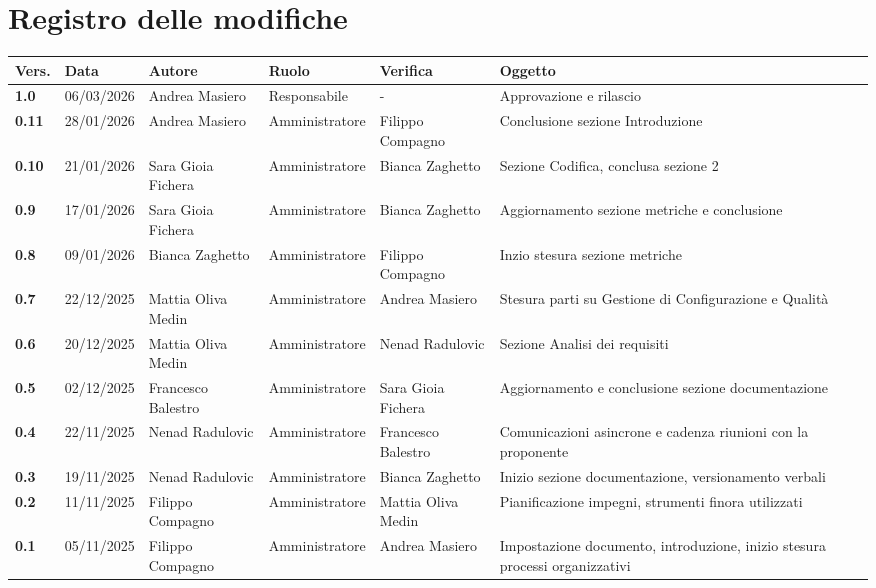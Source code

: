 \documentclass[a4paper,12pt]{article}
\begin{document}


\section*{Registro delle modifiche}
    \begin{xltabular}{\textwidth}{|l|l|X|l|X|X|}
        \hline
        \textbf{Vers.} & \textbf{Data} & \textbf{Autore} & \textbf{Ruolo} & \textbf{Verifica} & \textbf{Oggetto} \\
        \hline
        \endhead

        \endfoot

        \hline
        \endlastfoot

        \textbf{1.0} & 06/03/2026 & Andrea Masiero & Responsabile & - & Approvazione e rilascio \\
        \hline
        \textbf{0.11} & 28/01/2026 & Andrea Masiero & Amministratore & Filippo Compagno & Conclusione sezione Introduzione \\
        \hline
        \textbf{0.10} & 21/01/2026 & Sara Gioia Fichera & Amministratore & Bianca Zaghetto & Sezione Codifica, conclusa sezione 2 \\
        \hline
        \textbf{0.9} & 17/01/2026 & Sara Gioia Fichera & Amministratore & Bianca Zaghetto & Aggiornamento sezione metriche e conclusione \\
        \hline
        \textbf{0.8} & 09/01/2026 & Bianca Zaghetto & Amministratore & Filippo Compagno & Inzio stesura sezione metriche \\
        \hline
        \textbf{0.7} & 22/12/2025 & Mattia Oliva Medin & Amministratore & Andrea Masiero & Stesura parti su Gestione di Configurazione e Qualità \\
        \hline
        \textbf{0.6} & 20/12/2025 & Mattia Oliva Medin & Amministratore & Nenad Radulovic & Sezione Analisi dei requisiti \\
        \hline
        \textbf{0.5} & 02/12/2025 & Francesco Balestro & Amministratore & Sara Gioia Fichera & Aggiornamento e conclusione sezione documentazione \\
        \hline
        \textbf{0.4} & 22/11/2025 & Nenad Radulovic & Amministratore & Francesco Balestro & Comunicazioni asincrone e cadenza riunioni con la proponente \\
        \hline
        \textbf{0.3} & 19/11/2025 & Nenad Radulovic & Amministratore & Bianca Zaghetto & Inizio sezione documentazione, versionamento verbali \\
        \hline
        \textbf{0.2} & 11/11/2025 & Filippo Compagno & Amministratore & Mattia Oliva Medin & Pianificazione impegni, strumenti finora utilizzati \\
        \hline
        \textbf{0.1} & 05/11/2025 & Filippo Compagno & Amministratore & Andrea Masiero & Impostazione documento, introduzione, inizio stesura processi organizzativi \\
    \end{xltabular}
\end{document}
